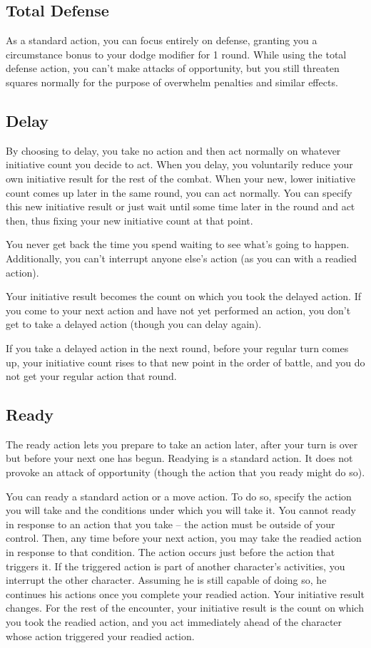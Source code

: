 \subsection{Total Defense}
As a standard action, you can focus entirely on defense, granting you a  circumstance bonus to your dodge modifier for 1 round. While using the total defense action, you can't make attacks of opportunity, but you still threaten squares normally for the purpose of overwhelm penalties and similar effects.

\subsection{Delay}
By choosing to delay, you take no action and then act normally on whatever initiative count you decide to act. When you delay, you voluntarily reduce your own initiative result for the rest of the combat. When your new, lower initiative count comes up later in the same round, you can act normally. You can specify this new initiative result or just wait until some time later in the round and act then, thus fixing your new initiative count at that point.

You never get back the time you spend waiting to see what's going to happen. Additionally, you can't interrupt anyone else's action (as you can with a readied action).

 Your initiative result becomes the count on which you took the delayed action. If you come to your next action and have not yet performed an action, you don't get to take a delayed action (though you can delay again).

If you take a delayed action in the next round, before your regular turn comes up, your initiative count rises to that new point in the order of battle, and you do not get your regular action that round.

\subsection{Ready}
The ready action lets you prepare to take an action later, after your turn is over but before your next one has begun. Readying is a standard action. It does not provoke an attack of opportunity (though the action that you ready might do so).

 You can ready a standard action or a move action. To do so, specify the action you will take and the conditions under which you will take it. You cannot ready in response to an action that you take -- the action must be outside of your control. Then, any time before your next action, you may take the readied action in response to that condition. The action occurs just before the action that triggers it. If the triggered action is part of another character's activities, you interrupt the other character. Assuming he is still capable of doing so, he continues his actions once you complete your readied action. Your initiative result changes. For the rest of the encounter, your initiative result is the count on which you took the readied action, and you act immediately ahead of the character whose action triggered your readied action.

